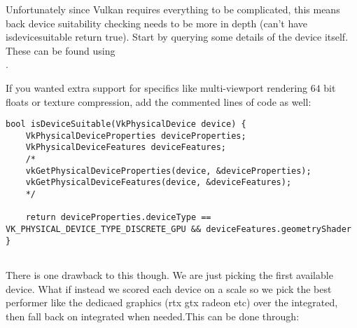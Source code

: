 \par Unfortunately since Vulkan requires everything to be complicated, this means back device suitability checking needs to be more in depth (can't have isdevicesuitable return true). Start by querying some details of the device itself. These can be found using \\ 
.

\par If you wanted extra support for specifics like multi-viewport rendering $64$ bit floats or texture compression, add the commented lines of code as well:


\begin{center}
\begin{minipage}{0.95\linewidth}
\begin{lstlisting}
bool isDeviceSuitable(VkPhysicalDevice device) {
    VkPhysicalDeviceProperties deviceProperties;
    VkPhysicalDeviceFeatures deviceFeatures;
    /*
    vkGetPhysicalDeviceProperties(device, &deviceProperties);
    vkGetPhysicalDeviceFeatures(device, &deviceFeatures);
    */

    return deviceProperties.deviceType ==  VK_PHYSICAL_DEVICE_TYPE_DISCRETE_GPU && deviceFeatures.geometryShader
}
    
\end{lstlisting}
\end{minipage}
\end{center}

\par There is one drawback to this though. We are just picking the first available device. What if instead we scored each device on a scale so we pick the best performer like the dedicaed graphics (rtx gtx radeon etc) over the integrated, then fall back on integrated when needed.This can be done through:

